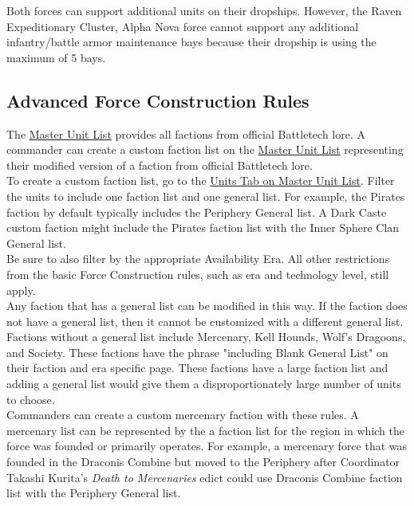 \documentclass[UTF8]{article}
\begin{document}
Both forces can support additional units on their dropships.
However, the Raven Expeditionary Cluster, Alpha Nova force cannot support any additional infantry/battle armor maintenance bays because their dropship is using the maximum of 5 bays.\\

\newpage

\subsection{Advanced Force Construction Rules}

The \href{http://www.masterunitlist.info/}{Master Unit List} provides all factions from official Battletech lore.
A commander can create a custom faction list on the \href{http://www.masterunitlist.info/}{Master Unit List} representing their modified version of a faction from official Battletech lore.\\

To create a custom faction list, go to the \href{http://www.masterunitlist.info/Unit/Filter}{Units Tab on Master Unit List}.
Filter the units to include one faction list and one general list.
For example, the Pirates faction by default typically includes the Periphery General list.
A Dark Caste custom faction might include the Pirates faction list with the Inner Sphere Clan General list.\\

Be sure to also filter by the appropriate Availability Era.
All other restrictions from the basic Force Construction rules, such as era and technology level, still apply.\\ 

Any faction that has a general list can be modified in this way.
If the faction does not have a general list, then it cannot be customized with a different general list.
Factions without a general list include Mercenary, Kell Hounds, Wolf's Dragoons, and Society.
These factions have the phrase "including Blank General List" on their faction and era specific page.
These factions have a large faction list and adding a general list would give them a disproportionately large number of units to choose.\\

Commanders can create a custom mercenary faction with these rules.
A mercenary list can be represented by the a faction list for the region in which the force was founded or primarily operates.
For example, a mercenary force that was founded in the Draconis Combine but moved to the Periphery after Coordinator Takashi Kurita's \emph{Death to Mercenaries} edict could use Draconis Combine faction list with the Periphery General list.\\
\end{document}
